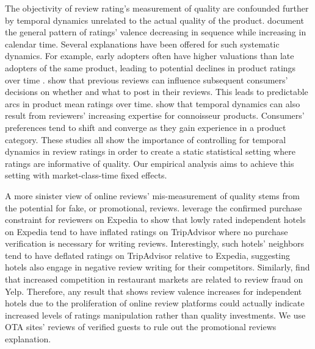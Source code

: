 \documentclass{informs_mod} %
\begin{document}
The objectivity of review rating's measurement of quality are confounded further by temporal dynamics unrelated to the actual quality of the product. \citet{godes2012sequential} document the general pattern of ratings' valence decreasing in sequence while increasing in calendar time. Several explanations have been offered for such systematic dynamics. For example, early adopters often have higher valuations than late adopters of the same product, leading to potential declines in product ratings over time \citep{li2008self}. \citet{moe2012online} show that previous reviews can influence subsequent consumers' decisions on whether and what to post in their reviews. This leads to predictable arcs in product mean ratings over time. \citet{mcauley2013amateurs} show that temporal dynamics can also result from reviewers' increasing expertise for connoisseur products. Consumers' preferences tend to shift and converge as they gain experience in a product category. These studies all show the importance of controlling for temporal dynamics in review ratings in order to create a static statistical setting where ratings are informative of quality. Our empirical analysis aims to achieve this setting with market-class-time fixed effects. 

A more sinister view of online reviews' mis-measurement of quality stems from the potential for fake, or promotional, reviews. \citet{mayzlin2014promotional} leverage the confirmed purchase constraint for reviewers on Expedia to show that lowly rated independent hotels on Expedia tend to have inflated ratings on TripAdvisor where no purchase verification is necessary for writing reviews. Interestingly, such hotels' neighbors tend to have deflated ratings on TripAdvisor relative to Expedia, suggesting hotels also engage in negative review writing for their competitors. Similarly, \citet{luca2016fake} find that increased competition in restaurant markets are related to review fraud on Yelp. Therefore, any result that shows review valence increases for independent hotels due to the proliferation of online review platforms could actually indicate increased levels of ratings manipulation rather than quality investments. We use OTA sites' reviews of verified guests to rule out the promotional reviews explanation.
\end{document}
